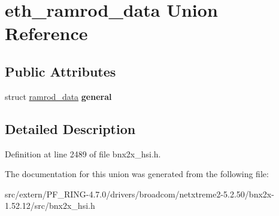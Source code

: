 \hypertarget{unioneth__ramrod__data}{
\section{eth\_\-ramrod\_\-data Union Reference}
\label{unioneth__ramrod__data}
}
\subsection*{Public Attributes}
\begin{DoxyCompactItemize}
\item 
\hypertarget{unioneth__ramrod__data_abc01c20ccbe8a5f02a66dc18d224d472}{
struct \hyperlink{structramrod__data}{ramrod\_\-data} {\bfseries general}}
\label{unioneth__ramrod__data_abc01c20ccbe8a5f02a66dc18d224d472}

\end{DoxyCompactItemize}


\subsection{Detailed Description}


Definition at line 2489 of file bnx2x\_\-hsi.h.



The documentation for this union was generated from the following file:\begin{DoxyCompactItemize}
\item 
src/extern/PF\_\-RING-\/4.7.0/drivers/broadcom/netxtreme2-\/5.2.50/bnx2x-\/1.52.12/src/bnx2x\_\-hsi.h\end{DoxyCompactItemize}
